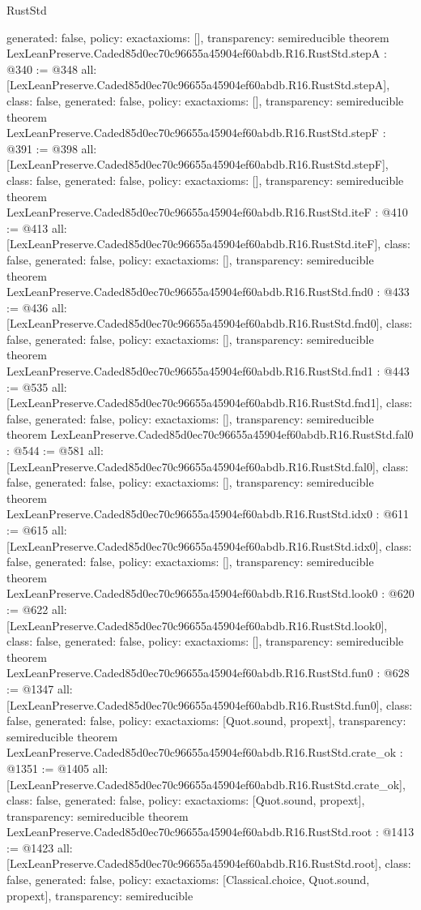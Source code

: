 \begin{lexlean}{RustStd}
\begin{coremodule}
{  generated: false,
  policy: exact{axioms: []},
  transparency: semireducible
}
theorem LexLeanPreserve.Caded85d0ec70c96655a45904ef60abdb.R16.RustStd.stepA : @340 := @348 {
  all: [LexLeanPreserve.Caded85d0ec70c96655a45904ef60abdb.R16.RustStd.stepA],
  class: false,
  generated: false,
  policy: exact{axioms: []},
  transparency: semireducible
}
theorem LexLeanPreserve.Caded85d0ec70c96655a45904ef60abdb.R16.RustStd.stepF : @391 := @398 {
  all: [LexLeanPreserve.Caded85d0ec70c96655a45904ef60abdb.R16.RustStd.stepF],
  class: false,
  generated: false,
  policy: exact{axioms: []},
  transparency: semireducible
}
theorem LexLeanPreserve.Caded85d0ec70c96655a45904ef60abdb.R16.RustStd.iteF : @410 := @413 {
  all: [LexLeanPreserve.Caded85d0ec70c96655a45904ef60abdb.R16.RustStd.iteF],
  class: false,
  generated: false,
  policy: exact{axioms: []},
  transparency: semireducible
}
theorem LexLeanPreserve.Caded85d0ec70c96655a45904ef60abdb.R16.RustStd.fnd0 : @433 := @436 {
  all: [LexLeanPreserve.Caded85d0ec70c96655a45904ef60abdb.R16.RustStd.fnd0],
  class: false,
  generated: false,
  policy: exact{axioms: []},
  transparency: semireducible
}
theorem LexLeanPreserve.Caded85d0ec70c96655a45904ef60abdb.R16.RustStd.fnd1 : @443 := @535 {
  all: [LexLeanPreserve.Caded85d0ec70c96655a45904ef60abdb.R16.RustStd.fnd1],
  class: false,
  generated: false,
  policy: exact{axioms: []},
  transparency: semireducible
}
theorem LexLeanPreserve.Caded85d0ec70c96655a45904ef60abdb.R16.RustStd.fal0 : @544 := @581 {
  all: [LexLeanPreserve.Caded85d0ec70c96655a45904ef60abdb.R16.RustStd.fal0],
  class: false,
  generated: false,
  policy: exact{axioms: []},
  transparency: semireducible
}
theorem LexLeanPreserve.Caded85d0ec70c96655a45904ef60abdb.R16.RustStd.idx0 : @611 := @615 {
  all: [LexLeanPreserve.Caded85d0ec70c96655a45904ef60abdb.R16.RustStd.idx0],
  class: false,
  generated: false,
  policy: exact{axioms: []},
  transparency: semireducible
}
theorem LexLeanPreserve.Caded85d0ec70c96655a45904ef60abdb.R16.RustStd.look0 : @620 := @622 {
  all: [LexLeanPreserve.Caded85d0ec70c96655a45904ef60abdb.R16.RustStd.look0],
  class: false,
  generated: false,
  policy: exact{axioms: []},
  transparency: semireducible
}
theorem LexLeanPreserve.Caded85d0ec70c96655a45904ef60abdb.R16.RustStd.fun0 : @628 := @1347 {
  all: [LexLeanPreserve.Caded85d0ec70c96655a45904ef60abdb.R16.RustStd.fun0],
  class: false,
  generated: false,
  policy: exact{axioms: [Quot.sound, propext]},
  transparency: semireducible
}
theorem LexLeanPreserve.Caded85d0ec70c96655a45904ef60abdb.R16.RustStd.crate_ok : @1351 := @1405 {
  all: [LexLeanPreserve.Caded85d0ec70c96655a45904ef60abdb.R16.RustStd.crate_ok],
  class: false,
  generated: false,
  policy: exact{axioms: [Quot.sound, propext]},
  transparency: semireducible
}
theorem LexLeanPreserve.Caded85d0ec70c96655a45904ef60abdb.R16.RustStd.root : @1413 := @1423 {
  all: [LexLeanPreserve.Caded85d0ec70c96655a45904ef60abdb.R16.RustStd.root],
  class: false,
  generated: false,
  policy: exact{axioms: [Classical.choice, Quot.sound, propext]},
  transparency: semireducible
}


\end{coremodule}
\end{lexlean}
